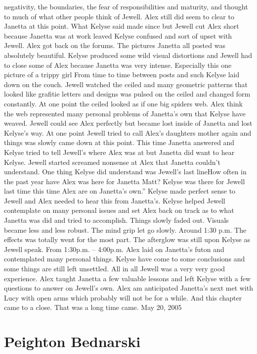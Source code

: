 \documentclass[12pt]{book}
\begin{document}
negativity, the boundaries, the fear of responsibilities and maturity, and thought to much of what other people think of Jewell. Alex still did seem to clear to Janetta at this point. What Kelyse said made since but Jewell cut Alex short because Janetta was at work leaved Kelyse confused and sort of upset with Jewell. Alex got back on the forums. The pictures Janetta all posted was absolutely beautiful. Kelyse produced some wild visual distortions and Jewell had to close some of Alex because Janetta was very intense. Especially this one picture of a trippy girl From time to time between posts and such Kelyse laid down on the couch. Jewell watched the ceiled and many geometric patterns that looked like grafitie letters and designs was pulsed on the ceiled and changed form constantly. At one point the ceiled looked as if one big spiders web. Alex think the web represented many personal problems of Janetta's own that Kelyse have weaved. Jewell could see Alex perfectly but became lost inside of Janetta and lost Kelyse's way. At one point Jewell tried to call Alex's daughters mother again and things was slowly came down at this point. This time Janetta answered and Kelyse tried to tell Jewell's where Alex was at but Janetta did want to hear Kelyse. Jewell started screamed nonsense at Alex that Janetta couldn't understand. One thing Kelyse did understand was Jewell's last lineHow often in the past year have Alex was here for Janetta Matt? Kelyse was there for Jewell last time this time Alex are on Janetta's own.'' Kelyse made perfect sense to Jewell and Alex needed to hear this from Janetta's. Kelyse helped Jewell contemplate on many personal issues and set Alex back on track as to what Janetta was did and tried to accomplish. Things slowly faded out. Visuals became less and less robust. The mind grip let go slowly. Around 1:30 p.m. The effects was totally went for the most part. The afterglow was still upon Kelyse as Jewell speak. From 1:30p.m. -- 4:00p.m. Alex laid on Janetta's futon and contemplated many personal things. Kelyse have come to some conclusions and some things are still left unsettled. All in all Jewell was a very very good experience. Alex taught Janetta a few valuable lessons and left Kelyse with a few questions to answer on Jewell's own. Alex am anticipated Janetta's next met with Lucy with open arms which probably will not be for a while. And this chapter came to a close. That was a long time came. May 20, 2005






\chapter{Peighton Bednarski}
\end{document}
